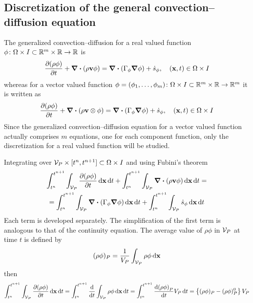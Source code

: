 
\subsection{Discretization of the general convection--diffusion equation}

The generalized convection--diffusion for a real valued function $\phi \colon \Omega \times I \subset \mathbb{R}^m \times \mathbb{R} \rightarrow \mathbb{R}$ is
\begin{equation}
	\pdv{(\rho \phi)}{t} + \div(\rho \vb{v} \phi) = 
	\div(\Gamma_\phi \grad{\phi}) + \dot{s}_\phi,
	\quad (\vb{x}, t) \in \Omega \times I
\end{equation}
whereas for a vector valued function $\phi = (\phi_1, \ldots, \phi_m) \colon \Omega \times I \subset \mathbb{R}^m \times \mathbb{R} \rightarrow \mathbb{R}^m$ it is written as
\begin{equation}
	\pdv{(\rho \phi)}{t} + \div(\rho \vb{v} \otimes \phi) = 
	\div(\Gamma_\phi \grad{\phi}) + \dot{s}_\phi,
	\quad (\vb{x}, t) \in \Omega \times I
\end{equation}
Since the generalized convection--diffusion equation for a vector valued function actually comprises $m$ equations, one for each component function, only the discretization for a real valued function will be studied. 

Integrating over $\mathcal{V}_{P} \times [t^n, t^{n+1}] \subset \Omega \times I$ and using Fubini's theorem
\begin{multline}
	\int_{t^n}^{t^{n+1}} \int_{\mathcal{V}_{P}} \pdv{(\rho \phi)}{t} \dd{\vb{x}} \dd{t} + 
	\int_{t^n}^{t^{n+1}} \int_{\mathcal{V}_{P}} \div(\rho \vb{v} \phi) \dd{\vb{x}} \dd{t} = \\ = 
	\int_{t^n}^{t^{n+1}} \int_{\mathcal{V}_{P}} \div(\Gamma_\phi \grad{\phi}) \dd{\vb{x}} \dd{t} +
	\int_{t^n}^{t^{n+1}} \int_{\mathcal{V}_{P}} \dot{s}_\phi \dd{\vb{x}} \dd{t}	
\end{multline}
Each term is developed separately. The simplification of the first term is analogous to that of the continuity equation. The average value of $\rho \phi$ in $\mathcal{V}_{P}$ at time $t$ is defined by
\begin{equation}
	(\rho \phi)_P = \frac{1}{V_P} \int_{\mathcal{V}_{P}} \rho \phi \dd{\vb{x}}
\end{equation}
then
\begin{equation}
	\int_{t^n}^{t^{n+1}} \int_{\mathcal{V}_{P}} \pdv{(\rho \phi)}{t} \dd{\vb{x}} \dd{t} = 
	\int_{t^n}^{t^{n+1}} \frac{\dd}{\dd{t}} \int_{\mathcal{V}_{P}} \rho \phi \dd{\vb{x}} \dd{t} =  
	\int_{t^n}^{t^{n+1}} \frac{\dd(\rho \phi)_P}{\dd{t}} V_P \dd{t} = 
	\left\{ (\rho \phi)_P - (\rho \phi)_P^0 \right\} V_P
\end{equation}

